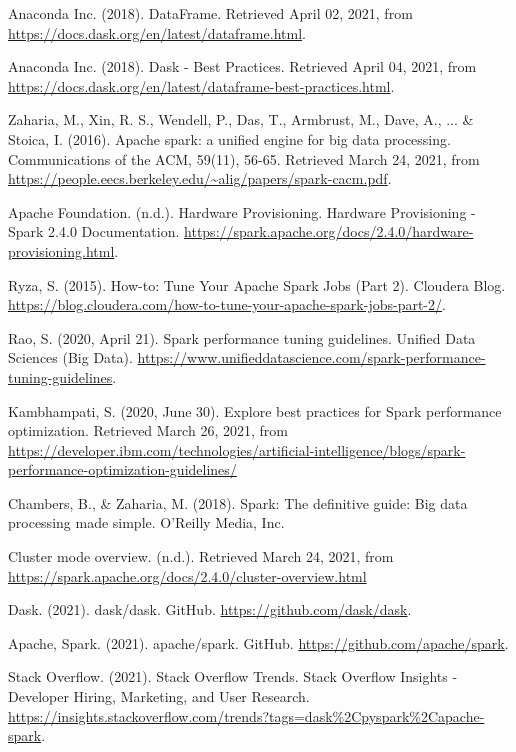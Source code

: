 \documentclass[11pt, oneside]{book}
\begin{document}
\begin{thebibliography}{111}
 Anaconda Inc. (2018). DataFrame. Retrieved April 02, 2021, from \url{https://docs.dask.org/en/latest/dataframe.html}.

 Anaconda Inc. (2018). Dask - Best Practices. Retrieved April 04, 2021, from \url{https://docs.dask.org/en/latest/dataframe-best-practices.html}.

 Zaharia, M., Xin, R. S., Wendell, P., Das, T., Armbrust, M., Dave, A., ... \& Stoica, I. (2016). Apache spark: a unified engine for big data processing. Communications of the ACM, 59(11), 56-65. Retrieved March 24, 2021, from \url{https://people.eecs.berkeley.edu/~alig/papers/spark-cacm.pdf}.

 Apache Foundation. (n.d.). Hardware Provisioning. Hardware Provisioning - Spark 2.4.0 Documentation. \url{https://spark.apache.org/docs/2.4.0/hardware-provisioning.html}.

 Ryza, S. (2015). How-to: Tune Your Apache Spark Jobs (Part 2). Cloudera Blog. \url{https://blog.cloudera.com/how-to-tune-your-apache-spark-jobs-part-2/}. 

 Rao, S. (2020, April 21). Spark performance tuning guidelines. Unified Data Sciences (Big Data). \url{https://www.unifieddatascience.com/spark-performance-tuning-guidelines}. 

 Kambhampati, S. (2020, June 30). Explore best practices for Spark performance optimization. Retrieved March 26, 2021, from \url{https://developer.ibm.com/technologies/artificial-intelligence/blogs/spark-performance-optimization-guidelines/}

 Chambers, B., \& Zaharia, M. (2018). Spark: The definitive guide: Big data processing made simple. O'Reilly Media, Inc.

 Cluster mode overview. (n.d.). Retrieved March 24, 2021, from \url{https://spark.apache.org/docs/2.4.0/cluster-overview.html}


 Dask. (2021). dask/dask. GitHub. \url{https://github.com/dask/dask}.

 Apache, Spark. (2021). apache/spark. GitHub. \url{https://github.com/apache/spark}.

 Stack Overflow. (2021). Stack Overflow Trends. Stack Overflow Insights - Developer Hiring, Marketing, and User Research. \url{https://insights.stackoverflow.com/trends?tags=dask\%2Cpyspark\%2Capache-spark}.   


\end{thebibliography}
\end{document}
